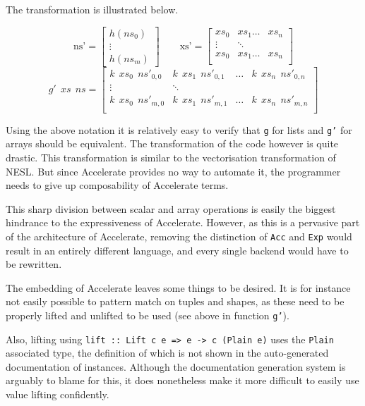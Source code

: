 The transformation is illustrated below.

\[
\textrm{ns'} =
\begin{bmatrix}
  h(ns_0) \\
  \vdots \\
  h(ns_m)
\end{bmatrix}
\qquad
\textrm{xs'} =
\begin{bmatrix}
  xs_0 & xs_1 \ldots & xs_n \\
  \vdots & \ddots \\
  xs_0 & xs_1 \ldots & xs_n \\
\end{bmatrix}
\]
\[
g'\ \ xs\ \ ns =
\begin{bmatrix}
  k\ \ xs_0\ \ ns'_{0,0} & k\ \ xs_1\ \ ns'_{0,1} & \ldots &  k\ \ xs_n\ \ ns'_{0,n}  \\
\vdots & \ddots \\
  k\ \ xs_0\ \ ns'_{m,0} & k\ \ xs_1\ \ ns'_{m,1}  & \ldots &  k\ \ xs_n\ \ ns'_{m,n}   \\
\end{bmatrix}
\]

Using the above notation it is relatively easy to verify that \texttt{g} for
lists and \texttt{g'} for arrays should be equivalent.  The transformation of
the code however is quite drastic.  This transformation is similar to the
vectorisation transformation of NESL\cite{nesl}.  But since Accelerate provides
no way to automate it, the programmer needs to give up composability of
Accelerate terms.

This sharp division between scalar and array operations is easily the biggest
hindrance to the expressiveness of Accelerate. However, as this is a pervasive
part of the architecture of Accelerate, removing the distinction of
\texttt{Acc} and \texttt{Exp} would result in an entirely different language,
and every single backend would have to be rewritten.

The embedding of Accelerate leaves some things to be desired. It is for
instance not easily possible to pattern match on tuples and shapes, as these
need to be properly lifted and unlifted to be used (see above in function \texttt{g'}).

Also, lifting using \texttt{lift :: Lift c e => e -> c (Plain e)} uses the
\texttt{Plain} associated type, the definition of which is not shown in the
auto-generated documentation of instances. Although the documentation
generation system is arguably to blame for this, it does nonetheless make it
more difficult to easily use value lifting confidently.

